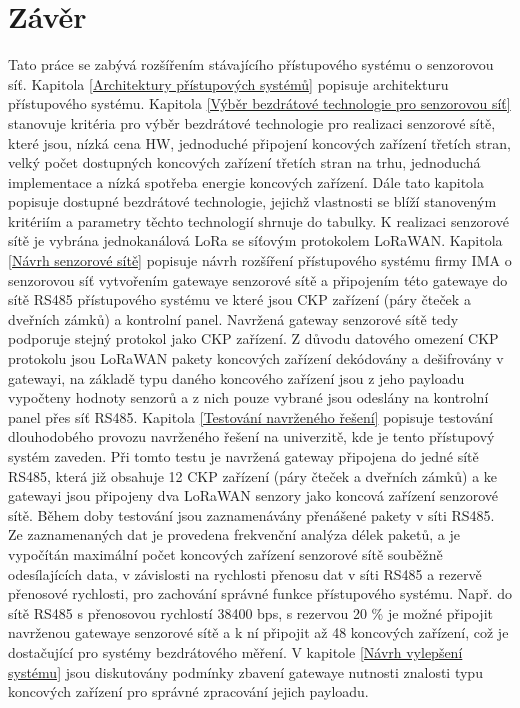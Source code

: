 \chapter{Závěr}
%
Tato práce se zabývá rozšířením stávajícího přístupového systému o senzorovou síť.
%
Kapitola \ref{Architektury přístupových systémů} popisuje architekturu přístupového systému.
%
Kapitola \ref{Výběr bezdrátové technologie pro senzorovou síť} stanovuje kritéria pro výběr bezdrátové technologie pro realizaci senzorové sítě, které jsou, nízká cena HW, jednoduché připojení  koncových zařízení třetích stran, velký počet dostupných koncových zařízení třetích stran na trhu, jednoduchá implementace a nízká spotřeba energie koncových zařízení.
Dále tato kapitola popisuje dostupné bezdrátové technologie, jejichž vlastnosti se blíží stanoveným kritériím a parametry těchto technologií shrnuje do tabulky. 
K realizaci senzorové sítě je vybrána jednokanálová LoRa se síťovým protokolem LoRaWAN.
%
Kapitola \ref{Návrh senzorové sítě} popisuje návrh rozšíření přístupového systému firmy IMA o senzorovou síť vytvořením gatewaye senzorové sítě a připojením této gatewaye do sítě RS485 přístupového systému ve které jsou CKP zařízení (páry čteček a dveřních zámků) a kontrolní panel. Navržená gateway senzorové sítě tedy podporuje stejný protokol jako CKP zařízení.
Z důvodu datového omezení CKP protokolu jsou LoRaWAN pakety koncových zařízení dekódovány a dešifrovány v gatewayi, na základě typu daného koncového zařízení jsou z jeho payloadu vypočteny hodnoty senzorů a z nich pouze vybrané jsou odeslány na kontrolní panel přes síť RS485.
%
Kapitola \ref{Testování navrženého řešení} popisuje testování dlouhodobého provozu navrženého řešení na univerzitě, kde je tento přístupový systém zaveden. 
Při tomto testu je navržená gateway připojena do jedné sítě RS485, která již obsahuje 12 CKP zařízení (páry čteček a dveřních zámků) a ke gatewayi jsou připojeny dva LoRaWAN senzory jako koncová zařízení senzorové sítě.
Během doby testování jsou zaznamenávány přenášené pakety v síti RS485.
Ze zaznamenaných dat je provedena frekvenční analýza délek paketů, a je vypočítán maximální počet koncových zařízení senzorové sítě souběžně odesílajících data, v závislosti na rychlosti přenosu dat v síti RS485 a rezervě přenosové rychlosti, pro zachování správné funkce přístupového systému.
Např. do sítě RS485 s přenosovou rychlostí 38400 bps, s rezervou 20 \% je možné připojit navrženou gatewaye senzorové sítě a k ní připojit až 48 koncových zařízení, což je dostačující pro systémy bezdrátového měření.
%
V kapitole \ref{Návrh vylepšení systému} jsou diskutovány podmínky zbavení gatewaye nutnosti znalosti typu koncových zařízení pro správné zpracování jejich payloadu. 
